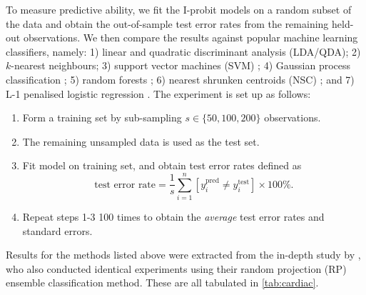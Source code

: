 \documentclass[showframe,11pt]{report}\usepackage[]{graphicx}\usepackage{xcolor}
\begin{document}
To measure predictive ability, we fit the I-probit models on a random subset of the data and obtain the out-of-sample test error rates from the remaining held-out observations.
We then compare the results against popular machine learning classifiers, namely: 1) linear and quadratic discriminant analysis (LDA/QDA); 2) $k$-nearest neighbours; 3) support vector machines (SVM) \citep{steinwart2008support}; 4) Gaussian process classification \citep{rasmussen2006gaussian}; 5) random forests \citep{breiman2001random}; 6) nearest shrunken centroids (NSC) \citep{tibshirani2002diagnosis}; and 7) L-1 penalised logistic regression \citep{friedman2001elements}.
The experiment is set up as follows:
\begin{enumerate}
  \item Form a training set by sub-sampling $s \in \{50, 100, 200\}$ observations.
  \item The remaining unsampled data is used as the test set.
  \item Fit model on training set, and obtain test error rates defined as
  \[
    \text{test error rate} = \frac{1}{s} \sum_{i=1}^n [y^{\text{pred}}_i \neq y^{\text{test}}_i] \times 100 \%.
  \]
  \item Repeat steps 1-3 100 times to obtain the \emph{average} test error rates and standard errors.
\end{enumerate}
Results for the methods listed above were extracted from the in-depth study by \citet{cannings2017random}, who also conducted identical experiments using their random projection (RP) ensemble classification method.
These are all tabulated in \cref{tab:cardiac}.
\end{document}
